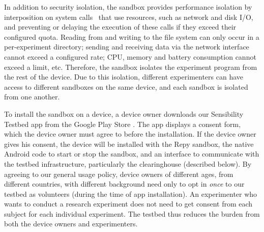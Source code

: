In addition to security isolation,
the sandbox provides performance isolation by
interposition on system calls~\cite{garfinkel2003traps} that 
use resources, such as network and disk I/O, and preventing 
or delaying the execution of these calls if they exceed 
their configured quota. 
Reading from and writing to the file system can
only occur in a per-experiment directory; sending and receiving
data via the network interface cannot exceed a configured rate;
CPU, memory and battery consumption cannot exceed a limit, etc.
Therefore, the sandbox isolates the experiment program from 
the rest of the device. Due to this isolation, different experimenters
can have access to different sandboxes on the same device,
and each sandbox is isolated from one another.

To install the sandbox on a device, a device owner downloads 
our Sensibility Testbed app from the Google Play Store \cite{sensibility-app}.
The app displays a consent form, which the device owner must 
agree to before the installation. If the device owner gives his
consent, the device will be installed with the Repy sandbox, the native Android code to 
start or stop the sandbox, and an interface to communicate with the testbed 
infrastructure, particularly the clearinghouse (described below). 
By agreeing to our general usage policy, device 
owners of different ages, from different countries, with different
background need only to opt in \textit{once} to our testbed as 
volunteers (during the time of app installation). An experimenter 
who wants to conduct a research experiment 
does not need to get consent from each subject for each individual
experiment. The testbed thus reduces the burden from both the 
device owners and experimenters. 

